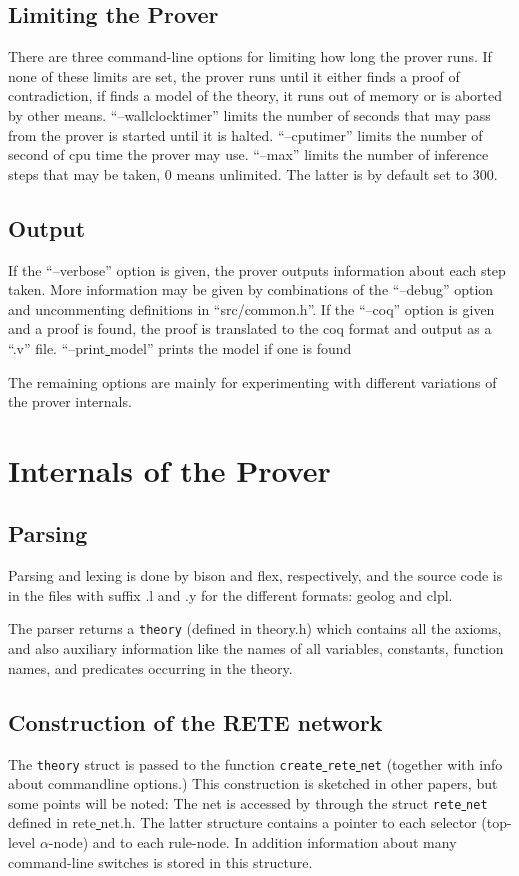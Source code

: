 \documentclass[a4paper]{article}
\begin{document}
\subsection{Limiting the Prover}
There are three command-line options for limiting how long the prover runs. If none of these limits are set, the prover runs until it either finds a proof of contradiction, if finds a model of the theory, it runs out of memory or is aborted by other means. ``--wallclocktimer'' limits the number of seconds that may pass from the prover is started until it is halted. ``--cputimer'' limits the number of second of cpu time the prover may use. ``--max'' limits the number of inference steps that may be taken, $0$ means unlimited. The latter is by default set to $300$.

\subsection{Output}
If the ``--verbose'' option is given, the prover outputs information about each step taken. More information may be given by combinations of the ``--debug'' option and uncommenting definitions in ``src/common.h''. 
If the ``--coq'' option is given and a proof is found, the proof is translated to the coq format and output as a ``.v'' file. ``--print\underline{ }model'' prints the model if one is found

The remaining options are mainly for experimenting with different variations of the prover internals. 
\section{Internals of the Prover}

\subsection{Parsing}
Parsing and lexing is done by bison and flex, respectively, and the source code is in the files with suffix .l and .y for the different formats: geolog and clpl. 

The parser returns a \verb|theory| (defined in theory.h) which contains all the axioms, and also auxiliary information like the names of all variables, constants, function names, and predicates occurring in the theory. 

\subsection{Construction of the RETE network}
The \verb|theory| struct is passed to the function \verb|create|\underline{ }\verb|rete|\underline{ }\verb|net| (together with info about commandline options.) This construction is sketched in other papers, but some points will be noted: The net is accessed by through the struct \verb|rete|\underline{ }\verb|net| defined in rete\underline{ }net.h. The latter structure contains a pointer to each selector (top-level $\alpha$-node) and to each rule-node. In addition information about many command-line switches is stored in this structure. 
\end{document}

